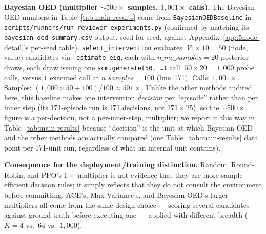 \documentclass[twoside]{article}
\theoremstyle{plain}
\theoremstyle{definition}
\theoremstyle{remark}
\begin{document}
\textbf{Bayesian OED (multiplier $\sim\!500\times$ samples, $1{,}001\times$ calls).} The Bayesian-OED numbers in Table~\ref{tab:main-results} come from \texttt{BayesianOEDBaseline} in \texttt{scripts/runners/run\_reviewer\_experiments.py} (confirmed by matching its \texttt{bayesian\_oed\_summary.csv} output, seed-for-seed, against Appendix~\ref{app:5node-detail}'s per-seed table). \texttt{select\_intervention} evaluates $|\mathcal V|\times10=50$ (node, value) candidates via \texttt{\_estimate\_eig}, each with $n\_mc\_samples{=}20$ posterior draws, each draw issuing one \texttt{scm.generate(50, \ldots)} call: $50\times20=1{,}000$ probe calls, versus $1$ executed call at $n\_samples=100$ (line~171). Calls: $1{,}001\times$. Samples: $(1{,}000\times50 + 100)/100 \approx 501\times$. Unlike the other methods audited here, this baseline makes one intervention \emph{decision} per ``episode'' rather than per inner step (its 171-episode run is 171 decisions, not $171\times25$), so the $\sim\!500\times$ figure is a per-decision, not a per-inner-step, multiplier; we report it this way in Table~\ref{tab:main-results} because ``decision'' is the unit at which Bayesian OED and the other methods are actually compared (one Table~\ref{tab:main-results} data point per 171-unit run, regardless of what an internal unit contains).

\textbf{Consequence for the deployment/training distinction.} Random, Round-Robin, and PPO's $1\times$ multiplier is not evidence that they are more sample-efficient decision rules; it simply reflects that they do not consult the environment before committing. ACE's, Max-Variance's, and Bayesian OED's larger multipliers all come from the same design choice --- scoring several candidates against ground truth before executing one --- applied with different breadth ($K{=}4$ vs.\ $64$ vs.\ $1{,}000$).
\end{document}
